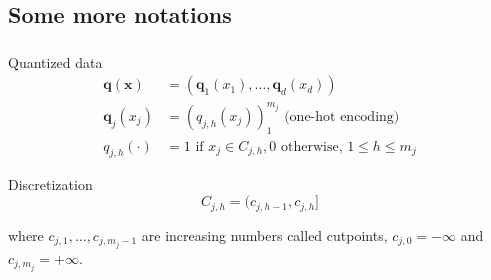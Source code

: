 \documentclass[english,xcolor={rgb,dvipsnames,table,usenames}]{beamer}
\newcommand\q{{\bm{q}}}
\newcommand\s{q}
\newcommand{\bx}{\boldsymbol{x}}
\begin{document}
\subsection{Some more notations}

\begin{frame}[allowframebreaks]
\frametitle{\subsecname}

%

\begin{block}{Quantized data}
\vspace*{-0.9cm}
\begin{align*}
\q(\bx) & = (\q_1(x_1),\dots,\q_d(x_d)) \\
\q_j(x_j) & = (\s_{j,h}(x_j))_1^{m_j} \text{ (one-hot encoding)} \\
\s_{j,h}(\cdot) & =  1 \text{ if } x_j \in C_{j,h}, 0 \text{ otherwise, } 1 \leq h \leq m_j
\end{align*}
\vspace*{-0.7cm}
\end{block}

\begin{animateinline}{2}%
{\color{red}{\bf Huge cardinality!}}%
\newframe \end{animateinline}

\pagebreak

\begin{block}{Discretization}
\vspace*{-0.4cm}
\[C_{j,h}=(c_{j,h-1},c_{j,h}]\]

where $c_{j,1},\ldots,c_{j,m_j-1}$ are increasing numbers called cutpoints, $c_{j,0}=-\infty$ and $c_{j,m_j}=+\infty$.
\end{block}

\bigskip

\begin{center}
\end{center}
\end{frame}
\end{document}
